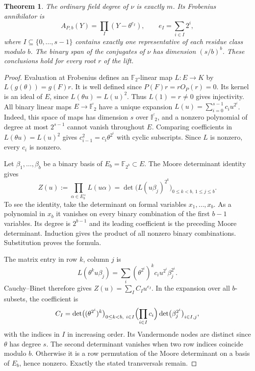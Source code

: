 \documentclass[11pt]{article}
\newtheorem{theorem}{Theorem}
\newcommand{\F}{\mathbb F_2}
\begin{document}
\begin{theorem}\label{thm:ore-norm-spectrum}
The ordinary field degree of \(\nu\) is exactly \(m\). Its Frobenius
annihilator is
\[
 A_{P,b}(Y)=\prod_I (Y-\theta^{e_I}),\qquad e_I=\sum_{i\in I}2^i ,
\]
where \(I\subseteq\{0,\ldots,s-1\}\) contains exactly one
representative of each residue class modulo \(b\).
The binary span of the conjugates of \(\nu\) has dimension \((s/b)^b\).
These conclusions hold for every root \(r\) of the lift.
\end{theorem}
\begin{proof}
Evaluation at Frobenius defines an \(\F\)-linear map
\(L:E\longrightarrow K\) by \(L(g(\theta))=g(F)r\).
It is well defined since \(P(F)r=rO_P(r)=0\). Its kernel is an
ideal of \(E\), since \(L(\theta u)=L(u)^2\). Thus \(L(1)=r\ne0\)
gives injectivity. All binary linear maps \(E\to\overline{\F}\)
have a unique expansion \(L(u)=\sum_{i=0}^{s-1}c_i u^{2^i}\).
Indeed, this space of maps has dimension \(s\) over \(\overline{\F}\),
and a nonzero polynomial of degree at most \(2^{s-1}\) cannot vanish
throughout \(E\). Comparing coefficients in \(L(\theta u)=L(u)^2\)
gives \(c_{i-1}^2=c_i\theta^{2^i}\) with cyclic subscripts.
Since \(L\) is nonzero, every \(c_i\) is nonzero.

Let \(\beta_1,\ldots,\beta_b\) be a binary basis of
\(E_b=\mathbb F_{2^b}\subset E\). The Moore determinant identity gives
\[
 Z(u):=\prod_{\alpha\in E_b^\times}L(u\alpha)
       =\det\bigl(L(u\beta_j)^{2^k}\bigr)_{0\le k<b,\ 1\le j\le b}.
\]
To see the identity, take the determinant on formal variables
\(x_1,\ldots,x_b\). As a polynomial in \(x_b\) it vanishes on
every binary combination of the first \(b-1\) variables. Its degree
is \(2^{b-1}\) and its leading coefficient is the preceding Moore
determinant. Induction gives the product of all nonzero binary
combinations. Substitution proves the formula.

The matrix entry in row \(k\), column \(j\) is
\[
 L(\theta^k u\beta_j)
    =\sum_i(\theta^{2^i})^k c_i u^{2^i}\beta_j^{2^i}.
\]
Cauchy--Binet therefore gives \(Z(u)=\sum_I C_Iu^{e_I}\).
In the expansion over all \(b\)-subsets, the coefficient is
\[
 C_I=\det\bigl((\theta^{2^i})^k\bigr)_{0\le k<b,\ i\in I}
      \Bigl(\prod_{i\in I}c_i\Bigr)
      \det\bigl(\beta_j^{2^i}\bigr)_{i\in I,j},
\]
with the indices in \(I\) in increasing order.
Its Vandermonde nodes are distinct since \(\theta\) has degree \(s\).
The second determinant vanishes when two row indices coincide modulo
\(b\). Otherwise it is a row permutation of the Moore determinant on
a basis of \(E_b\), hence nonzero. Exactly the stated transversals remain.


\end{proof}
\end{document}
